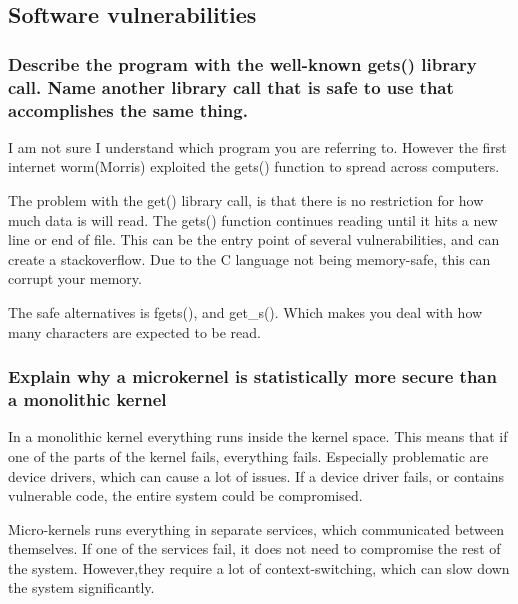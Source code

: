 \documentclass[a4paper]{article}
\begin{document}
\subsection{Software vulnerabilities}
\subsubsection{Describe the program with the well-known gets() library call. Name another library call that is safe to use that accomplishes the same thing.}

I am not sure I understand which program you are referring to. However the first internet worm(Morris) exploited the gets() function to spread across computers.

The problem with the get() library call, is that there is no restriction for how much data is will read. The gets() function continues reading until it hits a new line or end of file. This can be the entry point of several vulnerabilities, and can create a stackoverflow. Due to the C language not being memory-safe, this can corrupt your memory.

The safe alternatives is fgets(), and get\_s(). Which makes you deal with how many characters are expected to be read. 


\subsubsection{Explain why a microkernel is statistically more secure than a monolithic kernel}
In a monolithic kernel everything runs inside the kernel space. This means that if one of the parts of the kernel fails, everything fails. Especially problematic are device drivers, which can cause a lot of issues. If a device driver fails, or contains vulnerable code, the entire system could be compromised.

Micro-kernels runs everything in separate services, which communicated between themselves. If one of the services fail, it does not need to compromise the rest of the system. However,they require a lot of context-switching, which can slow down the system significantly.
\end{document}
